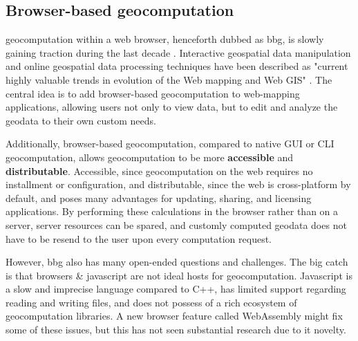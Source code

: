 \subsection*{Browser-based geocomputation}

\ac{geocomputation} within a web browser, henceforth dubbed as \ac{bbg}, is slowly gaining traction during the last decade \cite{kulawiak_analysis_2019, panidi_hybrid_2015, hamilton_client-side_2014}. 
Interactive geospatial data manipulation and online geospatial data processing techniques have been described as "current highly valuable trends in evolution of the Web mapping and Web GIS" \cite{panidi_hybrid_2015}. 
The central idea is to add browser-based geocomputation to web-mapping applications, allowing users not only to view data, but to edit and analyze the geodata to their own custom needs.

Additionally, browser-based geocomputation, compared to native GUI or CLI geocomputation, allows geocomputation to be more \textbf{accessible} and \textbf{distributable}. 
Accessible, since geocomputation on the web requires no installment or configuration, 
and distributable, since the web is cross-platform by default, and poses many advantages for updating, sharing, and licensing applications. 
By performing these calculations in the browser rather than on a server, server resources can be spared, and customly computed geodata does not have to be resend to the user upon every computation request.

However, \ac{bbg} also has many open-ended questions and challenges. 
The big catch is that browsers \& javascript are not ideal hosts for geocomputation. 
Javascript is a slow and imprecise language compared to C++, has limited support regarding reading and writing files, and does not possess of a rich ecosystem of geocomputation libraries.  
A new browser feature called WebAssembly might fix some of these issues, but this has not seen substantial research due to it novelty. 




